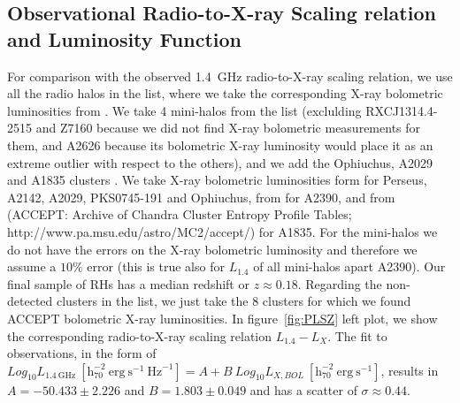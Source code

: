 \documentclass[traditabstract]{aa}
\newcommand{\rmn}{\mathrm}
\begin{document}
\begin{appendix}
\section{Observational Radio-to-X-ray Scaling relation and Luminosity Function}
\label{app:D}

For comparison with the observed 1.4~GHz radio-to-X-ray scaling relation, we use all the radio halos in the \cite{2011A&A...527A..99E} list, where we take the corresponding X-ray bolometric luminosities from \cite{2009A&A...507..661B}. We take 4 mini-halos from the \cite{2011A&A...527A..99E} list (exclulding RXCJ1314.4-2515 and Z7160 because we did not find X-ray bolometric measurements for them, and A2626 because its bolometric X-ray luminosity would place it as an extreme outlier with respect to the others), and we add the Ophiuchus, A2029 and A1835 clusters \citep{2009A&A...499..371G}. We take X-ray bolometric luminosities form \cite{2002ApJ...567..716R} for Perseus, A2142, A2029,  PKS0745-191 and Ophiuchus, from \cite{Boehringer:1998vv} for A2390, and from \cite{2009ApJS..182...12C} (ACCEPT: Archive of Chandra Cluster Entropy Profile Tables; http://www.pa.msu.edu/astro/MC2/accept/) for A1835. For the mini-halos we do not have the errors on the X-ray bolometric luminosity and therefore we assume a $10\%$ error (this is true also for $L_{1.4}$ of all mini-halos apart A2390). Our final sample of RHs has a median redshift or $z\approx0.18$. Regarding the non-detected clusters in the \cite{2011A&A...527A..99E} list, we just take the 8 clusters for which we found ACCEPT bolometric X-ray luminosities. In figure~\ref{fig:PLSZ} left plot, we show the corresponding radio-to-X-ray scaling relation $L_{1.4}-L_{X}$. The fit to observations, in the form of $Log_{10} L_{1.4~\rmn{GHz}}~[\rmn{h}_{70}^{-2}~\rmn{erg}~\rmn{s}^{-1}~\rmn{Hz}^{-1}] = A + B~Log_{10} L_{X, BOL}~[\rmn{h}_{70}^{-2}~\rmn{erg}~\rmn{s}^{-1}]$, results in $A=-50.433\pm2.226$ and $B=1.803\pm0.049$ and has a scatter of $\sigma \approx 0.44$. 


\end{appendix}
\end{document}
